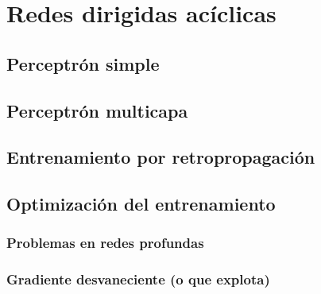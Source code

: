 \documentclass[12pt,openany]{book}
\begin{document}
\part{Redes dirigidas acíclicas}
\chapter{Perceptrón simple}






\chapter{Perceptrón multicapa}




\chapter{Entrenamiento por retropropagación}









\chapter{Optimización del entrenamiento} 
\section{Problemas en redes profundas}
\section{Gradiente desvaneciente (o que explota) }
\end{document}
